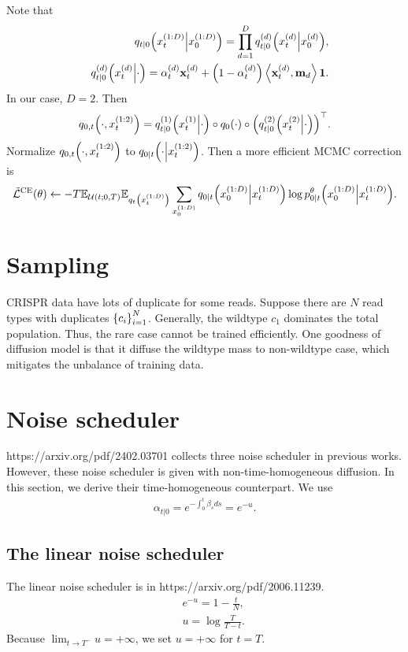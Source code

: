 \documentclass[10pt]{article}
\begin{document}
Note that
\begin{eqnarray*}
  &&q_{t|0}\qty(x^{(1:D)}_t\middle|x^{(1:D)}_0) = \prod_{d=1}^D q^{(d)}_{t|0}\qty(x^{(d)}_t\middle|x^{(d)}_0),\\
  &&q^{(d)}_{t|0}\qty(x^{(d)}_t\middle|\cdot) = \alpha^{(d)}_t \mathbf{x}^{(d)}_t + \qty(1 - \alpha^{(d)}_t)\left\langle\mathbf{x}^{(d)}_t, \mathbf{m}_d\right\rangle\mathbf{1}.
\end{eqnarray*}
In our case, $D = 2$. Then
\begin{eqnarray*}
  q_{0, t}\qty(\cdot, x^{(1:2)}_t) = q^{(1)}_{t|0}\qty(x^{(1)}_t\middle|\cdot) \circ q_0\qty(\cdot) \circ \qty(q^{(2)}_{t|0}\qty(x^{(2)}_t\middle|\cdot))^\top.
\end{eqnarray*}
Normalize $q_{0, t}\qty(\cdot, x^{(1:2)}_t)$ to $q_{0|t}\qty(\cdot\middle|x^{(1:2)}_t)$. Then a more efficient MCMC correction is
\begin{eqnarray*}
  \tilde{\mathcal{L}}^\text{CE}(\theta)\gets -T\mathbb{E}_{\mathcal{U}(t;0,T)}\mathbb{E}_{q_t\qty(x^{(1:D)}_t)}\sum_{x^{(1:D)}_0}q_{0|t}\qty(x^{(1:D)}_0\middle|x^{(1:D)}_t)\log p^\theta_{0|t}\qty(x^{(1:D)}_0\middle|x^{(1:D)}_t).
\end{eqnarray*}

\section{Sampling}
CRISPR data have lots of duplicate for some reads. Suppose there are $N$ read types with duplicates $\qty{c_i}_{i=1}^N$. Generally, the wildtype $c_1$ dominates the total population. Thus, the rare case cannot be trained efficiently. One goodness of diffusion model is that it diffuse the wildtype mass to non-wildtype case, which mitigates the unbalance of training data.


\section{Noise scheduler}

https://arxiv.org/pdf/2402.03701 collects three noise scheduler in previous works. However, these noise scheduler is given with non-time-homogeneous diffusion. In this section, we derive their time-homogeneous counterpart. We use
\begin{eqnarray*}
  \alpha_{t|0}= e^{-\int_0^t \beta_s ds} = e^{-u}.
\end{eqnarray*}

\subsection{The linear noise scheduler}
The linear noise scheduler is in https://arxiv.org/pdf/2006.11239.
\begin{eqnarray*}
  &&e^{-u} = 1 - \frac{t}{N},\\
  &&u = \log\frac{T}{T-t}.
\end{eqnarray*}
Because $\lim_{t\to T^-}u = +\infty$, we set $u=+\infty$ for $t=T$.
\end{document}
